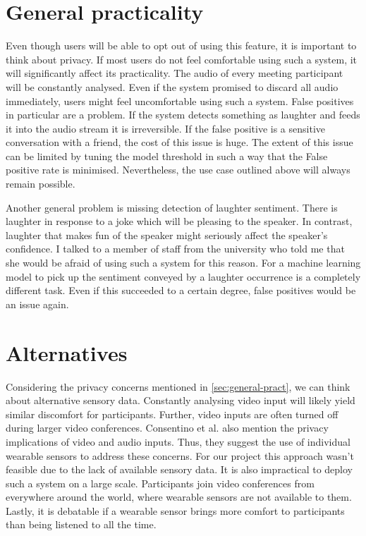\documentclass[bsc,frontabs,parskip,deptreport]{infthesis}
\begin{document}
\section{General practicality} \label{sec:general-pract}
Even though users will be able to opt out of using this feature, it is important to think about privacy. If most users do not feel comfortable using such a system, it will significantly affect its practicality.  
The audio of every meeting participant will be constantly analysed. Even if the system promised to discard all audio immediately, users might feel uncomfortable using such a system. False positives in particular are a problem. If the system detects something as laughter and feeds it into the audio stream it is irreversible. If the false positive is a sensitive conversation with a friend, the cost of this issue is huge. 
The extent of this issue can be limited by tuning the model threshold in such a way that the False positive rate is minimised. Nevertheless, the use case outlined above will always remain possible. 

Another general problem is missing detection of laughter sentiment. There is laughter in response to a joke which will be pleasing to the speaker. In contrast, laughter that makes fun of the speaker might seriously affect the speaker's confidence. I talked to a member of staff from the university who told me that she would be afraid of using such a system for this reason. 
For a machine learning model to pick up the sentiment conveyed by a laughter occurrence is a completely different task. Even if this succeeded to a certain degree, false positives would be an issue again. 


\section{Alternatives}
Considering the privacy concerns mentioned in \autoref{sec:general-pract}, we can think about alternative sensory data. 
Constantly analysing video input will likely yield similar discomfort for participants. Further, video inputs are often turned off during larger video conferences.
Consentino et al. \citep{cosentino2016quantitative}  also mention the privacy implications of video and audio inputs.
Thus, they suggest the use of individual wearable sensors to address these concerns. For our project this approach wasn't feasible due to the lack of available sensory data.
It is also impractical to deploy such a system on a large scale. Participants join video conferences from everywhere around the world, where wearable sensors are not available to them. Lastly, it is debatable if a wearable sensor brings more comfort to participants than being listened to all the time. 
\end{document}
